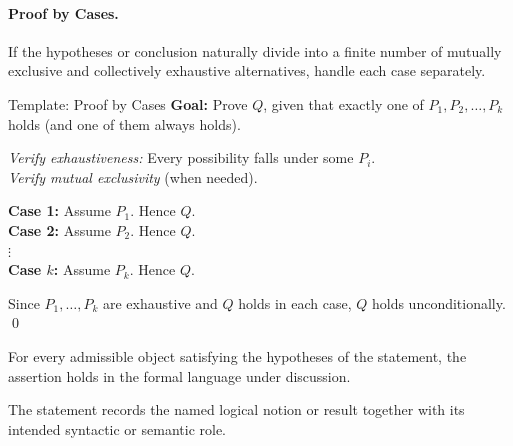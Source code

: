 \paragraph{Proof by Cases.}

If the hypotheses or conclusion naturally divide into a finite number
of mutually exclusive and collectively exhaustive alternatives, handle
each case separately.

\begin{propositionbox}{Template: Proof by Cases}
\textbf{Goal:} Prove $Q$, given that exactly one of $P_1, P_2, \ldots, P_k$
holds (and one of them always holds).

\medskip
\textit{Verify exhaustiveness:} Every possibility falls under some $P_i$.\\
\textit{Verify mutual exclusivity} (when needed).

\medskip
\textbf{Case 1:} Assume $P_1$. \quad [Argue.] \quad Hence $Q$.\\[4pt]
\textbf{Case 2:} Assume $P_2$. \quad [Argue.] \quad Hence $Q$.\\[4pt]
\hspace{1.2em}$\vdots$\\[4pt]
\textbf{Case $k$:} Assume $P_k$. \quad [Argue.] \quad Hence $Q$.

\medskip
Since $P_1, \ldots, P_k$ are exhaustive and $Q$ holds in each case,
$Q$ holds unconditionally. \qed
\end{propositionbox}
\begin{remark*}
For every admissible object satisfying the hypotheses of the statement, the
assertion holds in the formal language under discussion.
\end{remark*}

\begin{remark*}[Interpretation]
The statement records the named logical notion or result together with its
intended syntactic or semantic role.
\end{remark*}


